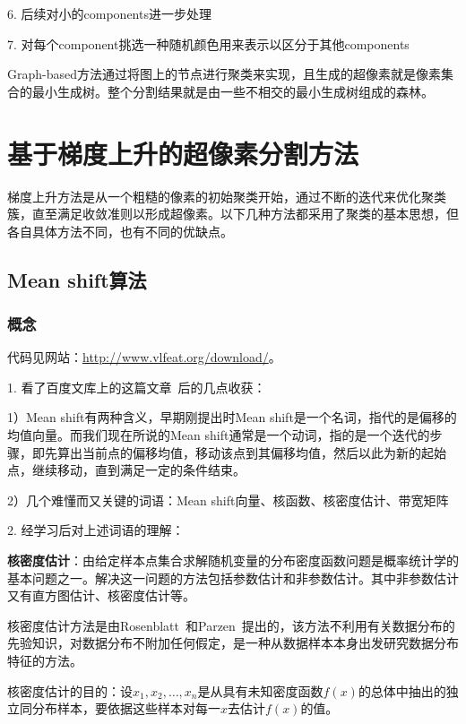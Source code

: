 \documentclass[12pt]{article}
\begin{document}
6. 后续对小的components进一步处理

7. 对每个component挑选一种随机颜色用来表示以区分于其他components

Graph-based方法通过将图上的节点进行聚类来实现，且生成的超像素就是像素集合的最小生成树。整个分割结果就是由一些不相交的最小生成树组成的森林。


\section{基于梯度上升的超像素分割方法}

梯度上升方法是从一个粗糙的像素的初始聚类开始，通过不断的迭代来优化聚类簇，直至满足收敛准则以形成超像素。以下几种方法都采用了聚类的基本思想，但各自具体方法不同，也有不同的优缺点。

\subsection{Mean shift算法}

\subsubsection{概念}

代码见网站：\url{http://www.vlfeat.org/download/}。

1. 看了百度文库上的这篇文章~\cite{MeanShiftIntroduction}后的几点收获：

1）Mean shift有两种含义，早期刚提出时Mean shift是一个名词，指代的是偏移的均值向量。而我们现在所说的Mean shift通常是一个动词，指的是一个迭代的步骤，即先算出当前点的偏移均值，移动该点到其偏移均值，然后以此为新的起始点，继续移动，直到满足一定的条件结束。

2）几个难懂而又关键的词语：Mean shift向量、核函数、核密度估计、带宽矩阵

2. 经学习后对上述词语的理解： 

\textbf{核密度估计}：由给定样本点集合求解随机变量的分布密度函数问题是概率统计学的基本问题之一。解决这一问题的方法包括参数估计和非参数估计。其中非参数估计又有直方图估计、核密度估计等。

核密度估计方法是由Rosenblatt~\cite{rosenblatt1956remarks}和Parzen~\cite{parzen1962estimation}提出的，该方法不利用有关数据分布的先验知识，对数据分布不附加任何假定，是一种从数据样本本身出发研究数据分布特征的方法。

核密度估计的目的：设$x_1, x_2, \ldots, x_n$是从具有未知密度函数$f(x)$的总体中抽出的独立同分布样本，要依据这些样本对每一$x$去估计$f(x)$的值。
\end{document}

